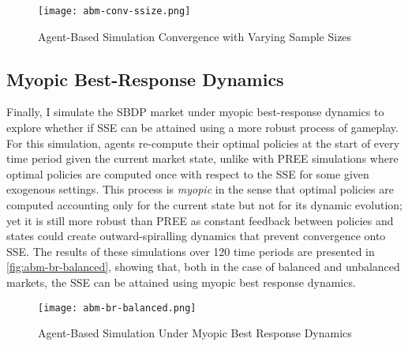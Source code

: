 \begin{figure}[ht] 
    \centering
    \caption{Agent-Based Simulation Convergence with Varying Sample Sizes}
    \texttt{[image: abm-conv-ssize.png]}
    \label{fig:abm-conv-ssize}
\end{figure} 

\subsection{Myopic Best-Response Dynamics}
Finally, I simulate the SBDP market under myopic best-response dynamics to explore whether if SSE can be attained using a more robust process of gameplay. For this simulation, agents re-compute their optimal policies at the start of every time period given the current market state, unlike with PREE simulations where optimal policies are computed once with respect to the SSE for some given exogenous settings. This process is \textit{myopic} in the sense that optimal policies are computed accounting only for the current state but not for its dynamic evolution; yet it is still more robust than PREE as constant feedback between policies and states could create outward-spiralling dynamics that prevent convergence onto SSE. The results of these simulations over 120 time periods are presented in \autoref{fig:abm-br-balanced}, showing that, both in the case of balanced and unbalanced markets, the SSE can be attained using myopic best response dynamics.

\begin{figure}[ht] 
    \centering
    \caption{Agent-Based Simulation Under Myopic Best Response Dynamics}
    \texttt{[image: abm-br-balanced.png]}
    \label{fig:abm-br-balanced}
\end{figure}  


